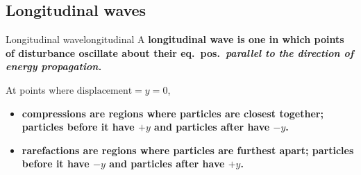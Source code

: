 \subsection{Longitudinal waves}
\begin{definition}{Longitudinal wave}{longitudinal}
	A \bf{longitudinal wave} is one in which points of disturbance oscillate about their eq.~pos.~\it{parallel}
	to the direction of energy propagation.
\end{definition}
At points where \(\text{displacement} = y = 0\),
\begin{itemize}
	\item \bf{compressions}	are regions where particles are closest together; particles before it have \(+y\) and particles after have \(-y\).
	\item \bf{rarefactions}	are regions where particles are furthest apart; particles before it have \(-y\) and particles after have \(+y\).
\end{itemize}
